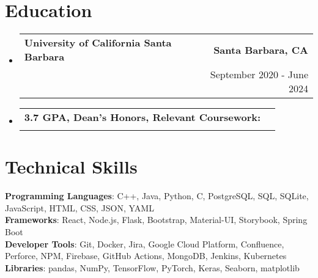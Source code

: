 \documentclass[letterpaper,11pt]{article}
\makeatletter
\newcommand{\resumeItem}[1]{
  \item\small{
    {#1 \vspace{-2pt}}
  }
}
\newcommand{\resumeSubheading}[4]{
  \vspace{-2pt}\item
    \begin{tabular*}{0.97\textwidth}[t]{l@{\extracolsep{\fill}}r}
      \textbf{#1} & #2 \\
      \text{#3} & #4 \\
    \end{tabular*}\vspace{-7pt}
}
\newcommand{\resumeSubHeadingListStart}{\begin{itemize}[leftmargin=0.15in, label={}]}
\newcommand{\resumeSubHeadingListEnd}{\end{itemize}}
\newcommand{\resumeItemListStart}{\begin{itemize}}
\newcommand{\resumeItemListEnd}{\end{itemize}\vspace{-5pt}}
\makeatother
\begin{document}
\section{\textbf{Education}}
  \resumeSubHeadingListStart
    \resumeSubheading
      {University of California Santa Barbara}{\textbf{Santa Barbara, CA}}
      {Bachelor of Science in Computer Engineering}{September 2020 - June 2024}
    \resumeSubheading
      {3.7 GPA, Dean's Honors, Relevant Coursework:}{}
      {\small{Data Structures, Algorithms, Operating Systems, AI, Machine Learning, Full Stack Web Development, UI/UX Design}}{}
  \resumeSubHeadingListEnd

%
\section{\textbf{Technical Skills}}
 \begin{itemize}[leftmargin=0.15in, label={}]
    \small{\item{
     \textbf{Programming Languages}{: C++, Java, Python, C, PostgreSQL, SQL, SQLite, JavaScript, HTML, CSS, JSON, YAML} \\
     \textbf{Frameworks}{: React, Node.js, Flask, Bootstrap, Material-UI, Storybook, Spring Boot} \\
     \textbf{Developer Tools}{: Git, Docker, Jira, Google Cloud Platform, Confluence, Perforce, NPM, Firebase, GitHub Actions, MongoDB, Jenkins, Kubernetes } \\
     \textbf{Libraries}{: pandas, NumPy, TensorFlow, PyTorch, Keras, Seaborn, matplotlib } \\
    }}
 \end{itemize}


\end{document}
